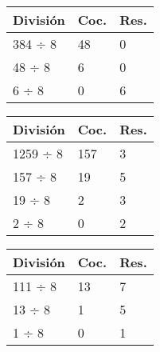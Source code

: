 \documentclass[12pt]{article}
\begin{document}
\begin{table}[H]
\centering
\begin{minipage}[t]{0.32\textwidth}
\centering
\begin{tabular}{lll}
\toprule
\textbf{División} & \textbf{Coc.} & \textbf{Res.} \\
\midrule
384 ÷ 8 & 48 & 0 \\
48 ÷ 8 & 6 & 0 \\
6 ÷ 8 & 0 & 6 \\
\bottomrule
\end{tabular}
\end{minipage}
\hfill
\begin{minipage}[t]{0.32\textwidth}
\centering
\begin{tabular}{lll}
\toprule
\textbf{División} & \textbf{Coc.} & \textbf{Res.} \\
\midrule
1259 ÷ 8 & 157 & 3 \\
157 ÷ 8 & 19 & 5 \\
19 ÷ 8 & 2 & 3 \\
2 ÷ 8 & 0 & 2 \\
\bottomrule
\end{tabular}
\end{minipage}
\hfill
\begin{minipage}[t]{0.32\textwidth}
\centering
\begin{tabular}{lll}
\toprule
\textbf{División} & \textbf{Coc.} & \textbf{Res.} \\
\midrule
111 ÷ 8 & 13 & 7 \\
13 ÷ 8 & 1 & 5 \\
1 ÷ 8 & 0 & 1 \\
\bottomrule
\end{tabular}
\end{minipage}
\end{table}
\end{document}
